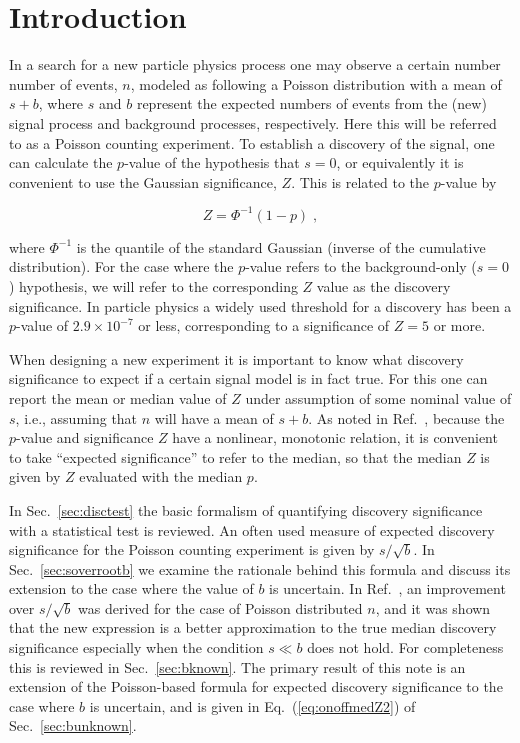 \documentclass[11pt]{article}
\begin{document}


\clearpage

\section{Introduction}
\label{sec:intro}

In a search for a new particle physics process one may observe a
certain number number of events, $n$, modeled as following a Poisson
distribution with a mean of $s + b$, where $s$ and $b$ represent the
expected numbers of events from the (new) signal process and
background processes, respectively.  Here this will be referred to as
a Poisson counting experiment.  To establish a discovery of the
signal, one can calculate the $p$-value of the hypothesis that $s =
0$, or equivalently it is convenient to use the Gaussian significance,
$Z$.  This is related to the $p$-value by

\begin{equation}
\label{eq:Zval}
Z = \Phi^{-1}(1 - p) \;,
\end{equation}

\noindent where $\Phi^{-1}$ is the quantile of the standard Gaussian
(inverse of the cumulative distribution).  For the case where the
$p$-value refers to the background-only ($s=0$) hypothesis, we will
refer to the corresponding $Z$ value as the discovery significance.
In particle physics a widely used threshold for a discovery has been a
$p$-value of $2.9 \times 10^{-7}$ or less, corresponding to a
significance of $Z = 5$ or more.

When designing a new experiment it is important to know what discovery
significance to expect if a certain signal model is in fact true.  For
this one can report the mean or median value of $Z$ under assumption
of some nominal value of $s$, i.e., assuming that $n$ will have a mean
of $s+b$.  As noted in Ref.~\cite{asimov}, because the $p$-value and
significance $Z$ have a nonlinear, monotonic relation, it is
convenient to take ``expected significance'' to refer to the median,
so that the median $Z$ is given by $Z$ evaluated with the median $p$.

In Sec.~\ref{sec:disctest} the basic formalism of quantifying
discovery significance with a statistical test is reviewed.  An often
used measure of expected discovery significance for the Poisson
counting experiment is given by $s/\sqrt{b}$.  In
Sec.~\ref{sec:soverrootb} we examine the rationale behind this formula
and discuss its extension to the case where the value of $b$ is
uncertain.  In Ref.~\cite{asimov}, an improvement over $s/\sqrt{b}$
was derived for the case of Poisson distributed $n$, and it was shown
that the new expression is a better approximation to the true median
discovery significance especially when the condition $s \ll b$ does
not hold.  For completeness this is reviewed in Sec.~\ref{sec:bknown}.
The primary result of this note is an extension of the Poisson-based
formula for expected discovery significance to the case where $b$ is
uncertain, and is given in Eq.~(\ref{eq:onoffmedZ2}) of
Sec.~\ref{sec:bunknown}.
\end{document}

